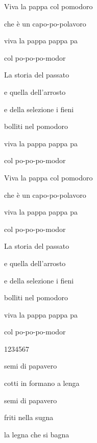 \documentclass{article}
\begin{document}
Viva la pappa col pomodoro

che \`e un capo-po-polavoro

viva la pappa pappa pa

col po-po-po-modor

La storia del passato

e quella dell'arrosto

e della selezione i fieni

bolliti nel pomodoro

viva la pappa pappa pa

col po-po-po-modor

Viva la pappa col pomodoro

che \`e un capo-po-polavoro

viva la pappa pappa pa

col po-po-po-modor

La storia del passato

e quella dell'arrosto

e della selezione i fieni

bolliti nel pomodoro

viva la pappa pappa pa

col po-po-po-modor

1234567

semi di papavero

cotti in formano a lenga

semi di papavero

friti nella sugna

la legna che si bagna
\end{document}
